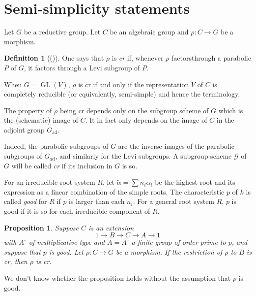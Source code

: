 \documentclass[11pt,a4paper]{article}
\theoremstyle{plain}
\newtheorem{proposition}[theorem]{Proposition}
\theoremstyle{definition}
\newtheorem{definition}[theorem]{Definition}
\DeclareMathOperator{\GL}{GL}
\newcommand{\ad}{\mathrm{ad}}
\begin{document}
\section{Semi-simplicity statements}
\label{sec:4}

Let $G$ be a reductive group. Let $C$ be an algebraic group and $\rho : C \to G$ be a morphism.

\begin{definition}[{(\cite[page~20]{S2})}] \label{def:4.1}
One says that $\rho$ is \emph{cr} if, whenever $\rho$ factorsthrough a parabolic $P$ of $G$, it factors through a Levi subgroup of $P$.
\end{definition}

When $G = \GL(V)$, $\rho$ is cr if and only if the representation $V$ of $C$ is completely reducible (or equivalently, semi-simple) and hence the terminology.

The property of $\rho$ being cr depends only on the subgroup scheme of $G$ which is the (schematic) image of $C$. It in fact only depends on the image of $C$ in the adjoint group $G_\ad$.

Indeed, the parabolic subgroups of $G$ are the inverse images of the parabolic subgroups of $G_\ad$, and similarly for the Levi subgroups. A subgroup scheme $\mathcal{G}$ of $G$ will be called \emph{cr} if its inclusion in $G$ is so.

For an irreducible root system $R$, let $\tilde{\alpha} = \sum n_i \alpha_i$ be the highest root and its expression as a linear combination of the simple roots. The characteristic $p$ of $k$ is called \emph{good} for $R$ if $p$ is larger than each $n_i$. For a general root system $R$, $p$ is good if it is so for each irreducible component of $R$.

\begin{proposition} \label{prop:4.2}
Suppose $C$ is an extension
\begin{equation} \label{eq:4.2.1}
1 \to B \to C \to A \to 1
\end{equation}
with $A^\circ$ of multiplicative type and $A = A^\circ$ a finite group of order prime to $p$, and suppose that $p$ is good. Let $\rho : C \to G$ be a morphism. If the restriction of $\rho$ to $B$ is cr, then $\rho$ is cr.
\end{proposition}

We don't know whether the proposition holds without the assumption that $p$ is good.
\end{document}
